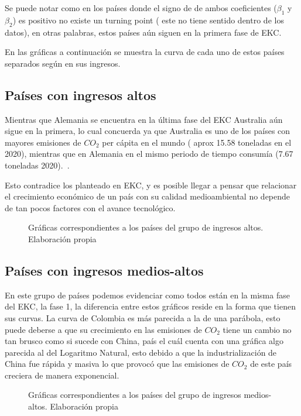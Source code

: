 \documentclass[11 pt]{article}
\begin{document}
Se puede notar como en los países donde el signo de de ambos coeficientes ($\beta_1$ y $\beta_2$) es positivo no existe un turning point ( este no tiene sentido dentro de los datos), en otras palabras, estos países aún siguen en la primera fase de EKC. 

En las gráficas a continuación se muestra la curva de cada uno de estos países separados según en sus ingresos. 

\subsection{Países con ingresos altos}
 Mientras que Alemania se encuentra en la última fase del EKC Australia aún sigue en la primera, lo cual concuerda ya que Australia es uno de los países con mayores emisiones de $CO_2$ per cápita en el mundo ( aprox 15.58 toneladas en el  2020), mientras que en Alemania en el mismo periodo de tiempo consumía (7.67 toneladas 2020).~\cite{owid}. 
 
 Esto contradice los planteado en EKC, y es posible llegar a pensar que relacionar el crecimiento económico de un país con su calidad medioambiental no depende de tan pocos factores con el avance tecnológico. 
 
 \begin{figure}[!htb]
 \centering
 \caption{Gráficas correspondientes a los países del grupo de ingresos altos. Elaboración propia}
 \end{figure}
\subsection{Países con ingresos medios-altos}
En este grupo de países podemos evidenciar como todos están en la misma fase del EKC, la fase 1, la diferencia entre estos gráficos reside en la forma que tienen sus curvas.  La curva de Colombia es más parecida a la de una parábola, esto puede deberse a que su crecimiento en las emisiones de $CO_2$ tiene un cambio no tan brusco como si sucede con China, país el cuál cuenta con una gráfica algo parecida al del Logaritmo Natural, esto debido a que la industrialización de China fue  rápida y masiva lo que provocó que las emisiones de $CO_2$ de este país creciera de manera exponencial.
\begin{figure}[!htb]
 \centering
    
 \caption{Gráficas correspondientes a los países del grupo de ingresos medios-altos. Elaboración propia}
 \end{figure}
 
\end{document}
